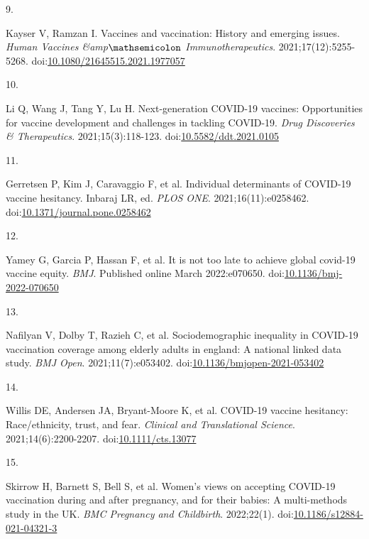 \documentclass[
]{article}
\newlength{\cslhangindent}
\newlength{\csllabelwidth}
\newlength{\cslentryspacingunit} %
\newenvironment{CSLReferences}[2] %
 {%
  \setlength{\parindent}{0pt}
  \ifodd #1
  \let\oldpar\par
  \def\par{\hangindent=\cslhangindent\oldpar}
  \fi
  \setlength{\parskip}{#2\cslentryspacingunit}
 }%
 {}
\newcommand{\CSLLeftMargin}[1]{\parbox[t]{\csllabelwidth}{#1}}
\newcommand{\CSLRightInline}[1]{\parbox[t]{\linewidth - \csllabelwidth}{#1}\break}
\begin{document}
\begin{CSLReferences}{0}{0}
\leavevmode{}%
\CSLLeftMargin{9. }%
\CSLRightInline{Kayser V, Ramzan I. Vaccines and vaccination: History
and emerging issues. \emph{Human Vaccines {\&}amp\(\mathsemicolon\)
Immunotherapeutics}. 2021;17(12):5255-5268.
doi:\href{https://doi.org/10.1080/21645515.2021.1977057}{10.1080/21645515.2021.1977057}}

\leavevmode{}%
\CSLLeftMargin{10. }%
\CSLRightInline{Li Q, Wang J, Tang Y, Lu H. Next-generation COVID-19
vaccines: Opportunities for vaccine development and challenges in
tackling COVID-19. \emph{Drug Discoveries \& Therapeutics}.
2021;15(3):118-123.
doi:\href{https://doi.org/10.5582/ddt.2021.0105}{10.5582/ddt.2021.0105}}

\leavevmode{}%
\CSLLeftMargin{11. }%
\CSLRightInline{Gerretsen P, Kim J, Caravaggio F, et al. Individual
determinants of {COVID}-19 vaccine hesitancy. Inbaraj LR, ed.
\emph{{PLOS} {ONE}}. 2021;16(11):e0258462.
doi:\href{https://doi.org/10.1371/journal.pone.0258462}{10.1371/journal.pone.0258462}}

\leavevmode{}%
\CSLLeftMargin{12. }%
\CSLRightInline{Yamey G, Garcia P, Hassan F, et al. It is not too late
to achieve global covid-19 vaccine equity. \emph{{BMJ}}. Published
online March 2022:e070650.
doi:\href{https://doi.org/10.1136/bmj-2022-070650}{10.1136/bmj-2022-070650}}

\leavevmode{}%
\CSLLeftMargin{13. }%
\CSLRightInline{Nafilyan V, Dolby T, Razieh C, et al. Sociodemographic
inequality in {COVID}-19 vaccination coverage among elderly adults in
england: A national linked data study. \emph{{BMJ} Open}.
2021;11(7):e053402.
doi:\href{https://doi.org/10.1136/bmjopen-2021-053402}{10.1136/bmjopen-2021-053402}}

\leavevmode{}%
\CSLLeftMargin{14. }%
\CSLRightInline{Willis DE, Andersen JA, Bryant-Moore K, et al.
{COVID}-19 vaccine hesitancy: Race/ethnicity, trust, and fear.
\emph{Clinical and Translational Science}. 2021;14(6):2200-2207.
doi:\href{https://doi.org/10.1111/cts.13077}{10.1111/cts.13077}}

\leavevmode{}%
\CSLLeftMargin{15. }%
\CSLRightInline{Skirrow H, Barnett S, Bell S, et al. Women's views on
accepting {COVID}-19 vaccination during and after pregnancy, and for
their babies: A multi-methods study in the {UK}. \emph{{BMC} Pregnancy
and Childbirth}. 2022;22(1).
doi:\href{https://doi.org/10.1186/s12884-021-04321-3}{10.1186/s12884-021-04321-3}}


\end{CSLReferences}
\end{document}
